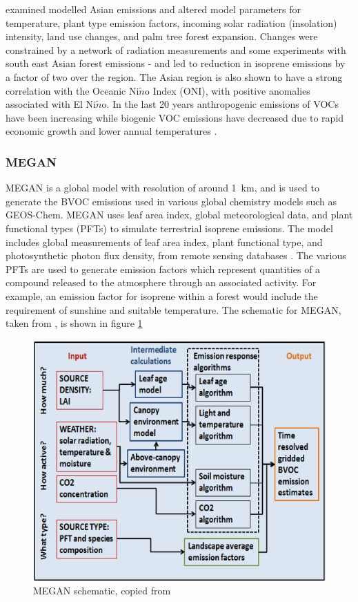   \cite{Stavrakou2014} examined modelled Asian emissions and altered model parameters for temperature, plant type emission factors, incoming solar radiation (insolation) intensity, land use changes, and palm tree forest expansion.
  Changes were constrained by a network of radiation measurements and some experiments with south east Asian forest emissions - and led to reduction in isoprene emissions by a factor of two over the region.
  The Asian region is also shown to have a strong correlation with the Oceanic Ni$\tilde{n}$o Index (ONI), with positive anomalies associated with El Ni$\tilde{n}$o.
  In the last 20 years anthropogenic emissions of VOCs have been increasing while biogenic VOC emissions have decreased due to rapid economic growth and lower annual temperatures \citep{Stavrakou2014, Kwon2017}.
  
  \subsubsection{MEGAN}
    MEGAN is a global model with resolution of around 1~km, and is used to generate the BVOC emissions used in various global chemistry models such as GEOS-Chem.
    MEGAN uses leaf area index, global meteorological data, and plant functional types (PFTs) to simulate terrestrial isoprene emissions.
    The model includes global measurements of leaf area index, plant functional type, and photosynthetic photon flux density, from remote sensing databases \citep{Kefauver2014}.
    The various PFTs are used to generate emission factors which represent quantities of a compound released to the atmosphere through an associated activity.
    For example, an emission factor for isoprene within a forest would include the requirement of sunshine and suitable temperature.
    The schematic for MEGAN, taken from \citet{Megan_Website}, is shown in figure \ref{LR:Models:fig_megan_schematic}
    
    \begin{figure}[!htbp]
      \includegraphics[width=\textwidth]{Figures/MEGANmodel_img.jpg}
      \caption{MEGAN schematic, copied from \citet{Megan_Website}}
      \label{LR:Models:fig_megan_schematic}
    \end{figure}
    
